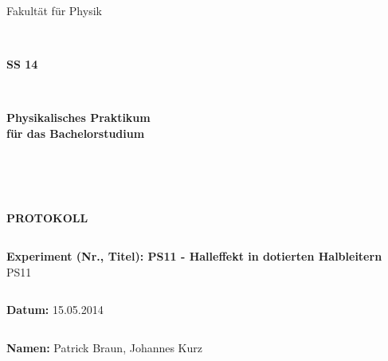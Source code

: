 \documentclass[12pt,a4paper]{article}
\begin{document}
\thispagestyle{empty}
			\begin{center}
			\Large{Fakultät für Physik}\\
			\end{center}
\begin{verbatim}


\end{verbatim}
			\begin{center}
			\textbf{\LARGE SS 14}
			\end{center}
\begin{verbatim}


\end{verbatim}
			\begin{center}
			\textbf{\LARGE{Physikalisches Praktikum\\ für das Bachelorstudium}}
			\end{center}
\begin{verbatim}




\end{verbatim}

			\begin{center}
			\textbf{\LARGE{PROTOKOLL}}
			\end{center}
			
\begin{verbatim}

\end{verbatim}

			\begin{flushleft}
			\textbf{\Large{Experiment (Nr., Titel): PS11 - Halleffekt in dotierten Halbleitern}}\\
			\LARGE{PS11 }	
			\end{flushleft}

\begin{verbatim}

\end{verbatim}	
			\begin{flushleft}
			\textbf{\Large{Datum:}} \Large{15.05.2014}
			\end{flushleft}
			
\begin{verbatim}
\end{verbatim}
		\begin{flushleft}
			\textbf{\Large{Namen:}} \Large{Patrick Braun, Johannes Kurz}
			\end{flushleft}
\end{document}
